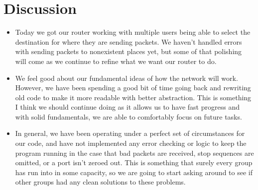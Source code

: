 \documentclass{article}
\begin{document}
\section*{Discussion}
\begin{itemize}
    \item Today we got our router working with multiple users being able to select the destination for where they are sending packets.
    We haven't handled errors with sending packets to nonexistent places yet, but some of that polishing will come as we continue to refine
    what we want our router to do.
    \item We feel good about our fundamental ideas of how the network will work. However, we have been spending a good bit of time going back and
    rewriting old code to make it more readable with better abstraction. This is something I think we should continue doing as it allows us
    to have fast progress and with solid fundamentals, we are able to comfortably focus on future tasks.
    \item In general, we have been operating under a perfect set of circumstances for our code, and have not implemented any error checking or logic
    to keep the program running in the case that bad packets are received, stop sequences are omitted, or a port isn't zeroed out. This is something that
    surely every group has run into in some capacity, so we are going to start asking around to see if other groups had any clean solutions to these problems.
\end{itemize}

\end{document}
